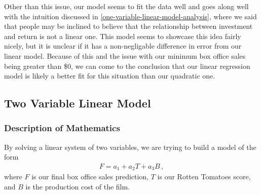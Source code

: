 \documentclass[11pt]{article}
\begin{document}
Other than this issue, our model seems to fit the data well and goes along well with the intuition discussed in \ref{one-variable-linear-model-analysis}, where we said that people may be inclined to believe that the relationship between investment and return is not a linear one.  This model seems to showcase this idea fairly nicely, but it is unclear if it has a non-negligable difference in error from our linear model.  
Because of this and the issue with our minimum box office sales being greater than \$0, we can come to the conclusion that our linear regression model is likely a better fit for this situation than our quadratic one.

\subsection{Two Variable Linear Model}
\subsubsection{Description of Mathematics}
By solving a linear system of two variables, we are trying to build a model of the form
\begin{align*}
    F = a_1 + a_2 T + a_3 B \, ,
\end{align*}
where $F$ is our final box office sales prediction, $T$ is our Rotten Tomatoes score, and $B$ is the production cost of the film. 
\\
\end{document}
